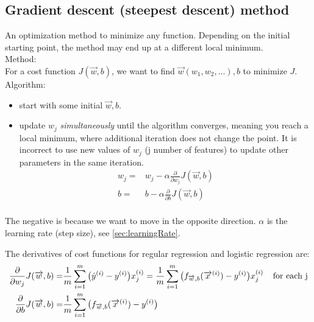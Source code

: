 \documentclass[12pt]{report}
\begin{document}
\subsection{Gradient descent (steepest descent) method}
\label{sec:gradient}

An optimization method to minimize any function. Depending on the initial starting point, the method may end up at a different local minimum. \\

Method: \\
For a cost function $J(\overrightarrow{w},b)$,  we want to find  $ \overrightarrow{w} (w_1, w_2, ...) , b$ to minimize $J$.\\

Algorithm: \\
\begin{itemize}
\item start with some initial $\overrightarrow{w}, b$.
\item update $w_j$ \textit{simultaneously} until the algorithm converges, meaning you reach a local minimum, where additional iteration does not change the point. It is incorrect to use new values of $w_j$  (j number of features) to update other parameters in the same iteration.
\begin{equation}
\begin{split}
  w_j =& w_j - \alpha \frac{\partial}{\partial w_j} J(\overrightarrow{w},b) \\
  b =& b - \alpha \frac{\partial  }{\partial b} J(\overrightarrow{w},b) \\
\end{split}
\end{equation}
\end{itemize}

The negative is because we want to move in the opposite direction. $\alpha$ is the learning rate (step size), see \ref{sec:learningRate}.

The derivatives of cost functions for regular regression and logistic regression are:
\begin{equation}
\label{eq:derivatives}
\begin{split}
\frac{\partial}{\partial w_j} J(\overrightarrow{w},b) =& \frac{1}{m} \sum_{i=1}^{m} \big(\hat{y}^{(i)} - y^{(i)} \big) x_j^{(i)} = \frac{1}{m} \sum_{i=1}^{m} \big( f_{\overrightarrow{w},b} (\overrightarrow{x}^{(i)}) - y^{(i)} \big) x_j^{(i)} \text{\: \: for each j} \\
\frac{\partial}{\partial b} J(\overrightarrow{w},b)   =& \frac{1}{m} \sum_{i=1}^{m} \big( f_{\overrightarrow{w},b} (\overrightarrow{x}^{(i)})  - y^{(i)} \big)
\end{split}
\end{equation}
\end{document}
